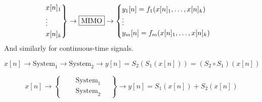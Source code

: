 \begin{definition}
    $$ \begin{rcases}
        x[n]_1 \\
        \vdots \\
        x[n]_k \end{rcases} \to \boxed{\text{MIMO}} \to \begin{cases}
        y_1[n] = f_1(x[n]_1, \ldots, x[n]_k) \\
        \vdots \\
        y_m[n] = f_m(x[n]_1, \ldots, x[n]_k) \end{cases}$$
    And similarly for continuous-time signals.
\end{definition}

\begin{definition}
    $$x[n] \to \boxed{\text{System}_1} \to \boxed{\text{System}_2} \to y[n] = S_2(S_1(x[n])) = (S_2 \circ S_1)(x[n])$$
\end{definition}

\begin{definition}
    $$x[n] \to \left\{\!\quad \begin{aligned}
        &\boxed{\text{System}_1} \\
        &\boxed{\text{System}_2} \end{aligned}\quad\right\} \to y[n] = S_1(x[n]) + S_2(x[n])$$
\end{definition}

\begin{definition}
\end{definition}
